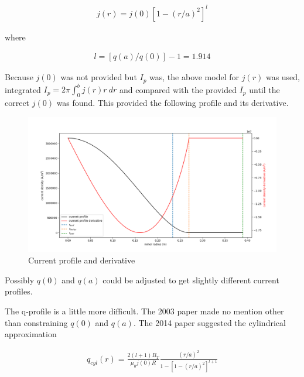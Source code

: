 \documentclass{article}
\begin{document}
\begin{equation} \label{wessonCurrentProfile}
\begin{split}
j(r)=j(0) \left[ 1-(r/a)^2 \right]^l
\end{split} 
\end{equation} 

\noindent where 

\begin{equation} \label{j}
\begin{split}
l=\left[ q(a)/q(0)\right]-1 = 1.914
\end{split} 
\end{equation} 

Because $j(0)$ was not provided but $I_p$ was, the above model for $j(r)$ was used, integrated $I_p = 2\pi \int_0^b j(r)r \ dr$ and compared with the provided $I_p$ until the correct $j(0)$ was found.  This provided the following profile and its derivative.


\begin{figure}[htb]
	\includegraphics[width=15cm]{images/wessonCurrentProfile.png}
	\caption{Current profile and derivative
		\label{fig:schedule}}    
\end{figure}  

\noindent Possibly $q(0)$ and $q(a)$ could be adjusted to get slightly different current profiles.  


The q-profile is a little more difficult.  The 2003 paper made no mention other than constraining $q(0)$ and $q(a)$.  The 2014 paper suggested the cylindrical approximation

\begin{equation} \label{qCylindrical}
\begin{split}
q_{cyl}(r)=\frac{2(l+1)B_T}{\mu_0 j(0) R} \frac{(r/a)^2}{1-\left[ 1-(r/a)^2\right]^{l+1}}
\end{split} 
\end{equation} 
\end{document}
